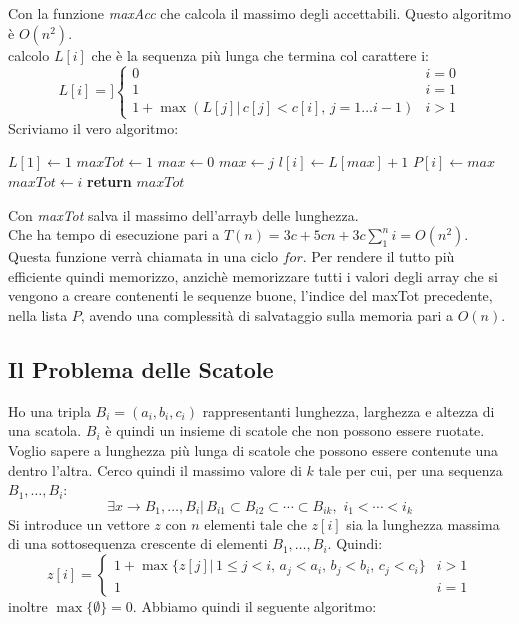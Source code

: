 \documentclass[a4paper,12pt, oneside]{book}
\begin{document}
Con la funzione \textit{maxAcc} che calcola il massimo degli
accettabili. Questo algoritmo è $O(n^2)$.\\
calcolo $L[i]$ che è la sequenza più lunga che termina col carattere i:
\[
  L[i]=]\begin{cases}
    0 & i=0\\
    1 & i=1\\
    1+\max(L[j]|\, c[j]<c[i],\, j=1\ldots i-1)  & i>1 
  \end{cases}
\]
Scriviamo il vero algoritmo:
\begin{algorithm}
  \begin{algorithmic}
    \State $L[1]\gets1$
    \State $maxTot \gets 1$
    \State $max \gets 0$
    \State $max \gets j$
    \EndIf
    \State $l[i]\gets L[max]+1$
    \State $P[i]\gets max$ 
    \State $maxTot \gets i$
    \EndIf
    \EndFor
    \EndFor
    \State \textbf{return} $maxTot$
    \EndFunction
  \end{algorithmic}
\end{algorithm}
Con \textit{maxTot} salva il massimo dell'arrayb delle lunghezza.\\
Che ha tempo di esecuzione pari a $T(n)=3c+5cn+3c\sum_1^ni=O(n^2)$.\\
Questa funzione verrà chiamata in una ciclo $for$. Per rendere il
tutto più efficiente quindi memorizzo, anzichè memorizzare tutti i
valori degli array che si vengono a creare contenenti le sequenze
buone, l'indice del maxTot precedente, nella lista $P$, avendo una
complessità di salvataggio sulla memoria pari a $O(n)$.\\
\subsection{Il Problema delle Scatole}
Ho una tripla $B_i=(a_i,b_i,c_i)$ rappresentanti lunghezza, larghezza
e altezza di una scatola. $B_i$ è quindi un insieme di scatole che non
possono essere ruotate. Voglio sapere a lunghezza più lunga di scatole
che possono essere contenute una dentro l’altra. Cerco quindi il
massimo valore di $k$ tale per cui, per una sequenza $ B_1,\ldots,B_i$:
\[\exists x\to B_1,\ldots,B_i|\,B_{i1}\subset B_{i2}\subset\cdots
  \subset B_{ik},\,\,i_1<\cdots<i_k\]
Si introduce un vettore $z$ con $n$ elementi tale che $z[i]$ sia la
lunghezza massima di una sottosequenza crescente di elementi $
B_1,\ldots,B_i$. Quindi:
\[
  z[i]=\begin{cases}
    1+\max\{z[j]|\, 1\leq j < i,\,a_j<a_i,\,b_j<b_i,\,c_j<c_i\} &
    i>1\\
    1 & i = 1
  \end{cases}
\]
inoltre $\max\{\emptyset\}=0$. Abbiamo quindi il seguente algoritmo:
\end{document}
